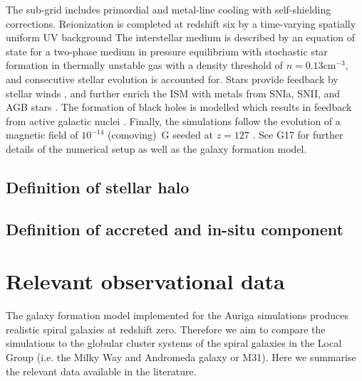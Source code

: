 \documentclass[a4paper,fleqn,usenatbib]{mnras}
\begin{document}
The sub-grid includes primordial and metal-line cooling with self-shielding corrections.
Reionization is completed at redshift six by a time-varying spatially uniform UV 
background \citep{2009ApJ...703.1416F, 2013MNRAS.436.3031V}
The interstellar medium is described by an equation of state for a two-phase medium
in pressure equilibrium \citep{2003MNRAS.339..289S} with stochastic star formation
in thermally unstable gas with a density threshold of $n = 0.13 \text{cm}^{-3}$,
and consecutive stellar evolution is accounted for. Stars provide feedback by 
stellar winds \citep{2014MNRAS.437.1750M, 2017MNRAS.467..179G}, and further 
enrich the ISM with metals from SNIa, SNII, and AGB stars \citep{2013MNRAS.436.3031V}.
The formation of black holes is modelled which results in feedback from active 
galactic nuclei \citep{2005MNRAS.361..776S, 2014MNRAS.437.1750M, 2017MNRAS.467..179G}.
Finally, the simulations follow the evolution of a magnetic field of $10^{-14}$
(comoving)~G seeded at $z = 127$ \citep{2013MNRAS.432..176P, 2014ApJ...783L..20P}.
See G17 for further details of the numerical setup as well as the galaxy formation
model.


\subsection{Definition of stellar halo}


\subsection{Definition of accreted and in-situ component}



\section{Relevant observational data}
\label{sec:observations}
The galaxy formation model implemented for the Auriga simulations produces
realistic spiral galaxies at redshift zero. Therefore we aim to compare the
simulations to the globular cluster systems of the spiral galaxies in the 
Local Group (i.e. the Milky Way and Andromeda galaxy or M31). Here we summarise 
the relevant data available in the literature.
\end{document}
